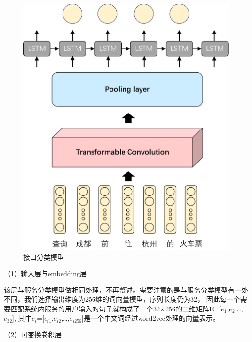 \begin{figure}[htbp]
  \centering
  \includegraphics[scale=0.4]{./images/tran-cnn-lstm.jpg}
  \caption{接口分类模型}
  \label{fig:tran-cnn-lstm}
\end{figure}
（1）输入层与embedding层

该层与服务分类模型做相同处理，不再赘述。需要注意的是与服务分类模型有一处不同，我们选择输出维度为256维的词向量模型，序列长度仍为32，
因此每一个需要匹配系统内服务的用户输入的句子就构成了一个32×256的二维矩阵E=[$e_{1}$,$e_{2}$,\dots,$e_{32}$],
其中$e_{i}$=[$e_{i1}$,$e_{i2}$,\dots,$e_{i256}$]是一个中文词经过word2vec处理的向量表示。

（2）可变换卷积层

